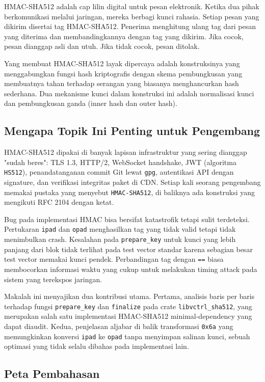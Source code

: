 \documentclass[11pt,a4paper]{article}
\begin{document}
HMAC-SHA512 adalah cap lilin digital untuk pesan elektronik. Ketika dua pihak berkomunikasi melalui jaringan, mereka berbagi kunci rahasia. Setiap pesan yang dikirim disertai tag HMAC-SHA512. Penerima menghitung ulang tag dari pesan yang diterima dan membandingkannya dengan tag yang dikirim. Jika cocok, pesan dianggap asli dan utuh. Jika tidak cocok, pesan ditolak.

Yang membuat HMAC-SHA512 layak dipercaya adalah konstruksinya yang menggabungkan fungsi hash kriptografis dengan skema pembungkusan yang membuatnya tahan terhadap serangan yang biasanya menghancurkan hash sederhana. Dua mekanisme kunci dalam konstruksi ini adalah normalisasi kunci dan pembungkusan ganda (inner hash dan outer hash).

\subsection{Mengapa Topik Ini Penting untuk Pengembang}

HMAC-SHA512 dipakai di banyak lapisan infrastruktur yang sering dianggap "sudah beres": TLS 1.3, HTTP/2, WebSocket handshake, JWT (algoritma \texttt{HS512}), penandatanganan commit Git lewat \texttt{gpg}, autentikasi API dengan signature, dan verifikasi integritas paket di CDN. Setiap kali seorang pengembang memakai pustaka yang menyebut \texttt{HMAC-SHA512}, di baliknya ada konstruksi yang mengikuti RFC 2104 dengan ketat.

Bug pada implementasi HMAC bisa bersifat katastrofik tetapi sulit terdeteksi. Pertukaran \texttt{ipad} dan \texttt{opad} menghasilkan tag yang tidak valid tetapi tidak menimbulkan crash. Kesalahan pada \texttt{prepare\_key} untuk kunci yang lebih panjang dari blok tidak terlihat pada test vector standar karena sebagian besar test vector memakai kunci pendek. Perbandingan tag dengan \texttt{==} biasa membocorkan informasi waktu yang cukup untuk melakukan timing attack pada sistem yang terekspos jaringan.

Makalah ini menyajikan dua kontribusi utama. Pertama, analisis baris per baris terhadap fungsi \texttt{prepare\_key} dan \texttt{finalize} pada crate \texttt{libvctrl\_sha512}, yang merupakan salah satu implementasi HMAC-SHA512 minimal-dependency yang dapat diaudit. Kedua, penjelasan aljabar di balik transformasi \texttt{0x6a} yang memungkinkan konversi \texttt{ipad} ke \texttt{opad} tanpa menyimpan salinan kunci, sebuah optimasi yang tidak selalu dibahas pada implementasi lain.

\subsection{Peta Pembahasan}
\end{document}
